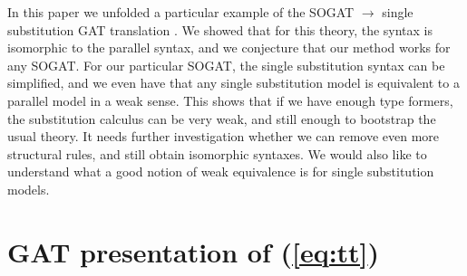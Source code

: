 \documentclass[sigplan,10pt,anonymous,review]{acmart}\settopmatter{printfolios=true,printccs=false,printacmref=false}
\newcommand{\ra}{\rightarrow}
\begin{document}
In this paper we unfolded a particular example of the SOGAT $\ra$
single substitution GAT translation
\cite{DBLP:conf/fscd/KaposiX24}. We showed that for this theory, the
syntax is isomorphic to the parallel syntax, and we conjecture that
our method works for any SOGAT. For our particular SOGAT, the single
substitution syntax can be simplified, and we even have that any
single substitution model is equivalent to a parallel model in a weak
sense. This shows that if we have enough type formers, the
substitution calculus can be very weak, and still enough to bootstrap
the usual theory. It needs further investigation whether we can remove
even more structural rules, and still obtain isomorphic syntaxes. We
would also like to understand what a good notion of weak equivalence
is for single substitution models.

{}


\pagebreak

\phantom{A}

\pagebreak

\appendix

\section{GAT presentation of (\ref{eq:tt})}
\label{app:tt}
\end{document}
